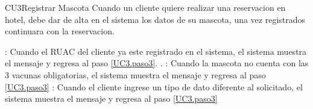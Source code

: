 \begin{UseCase}{CU3}{Registrar Mascota}{
		Cuando un cliente quiere realizar una reservacion en hotel, debe dar de alta en el sistema los datos de su mascota, una vez registrados continuara con la reservacion.
	}
{\begin{Titemize}
			: Cuando el RUAC del cliente ya este registrado en el sistema, el sistema muestra el mensaje  y regresa al paso \ref{UC3.paso3}.
.
			: Cuando la mascota no cuenta con las 3 vacunas obligatorias, el sistema muestra el mensaje  y regresa al paso \ref{UC3.paso3}
			: Cuando el cliente ingrese un tipo de dato diferente al solicitado, el sistema muestra el mensaje  y regresa al paso \ref{UC3.paso3}
			
		\end{Titemize}
	}
\end{UseCase}

